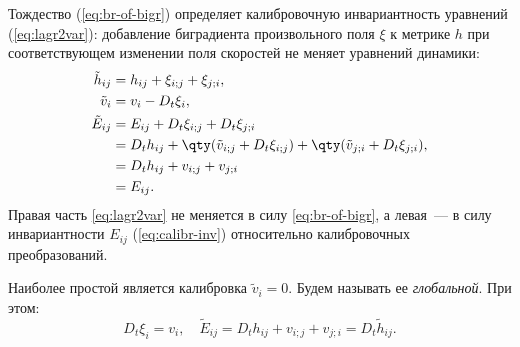 \documentclass[\docroot/reports/draft/report.tex]{subfiles}
\begin{document}
\label{sec:gauge-invariance}

    Тождество (\ref{eq:br-of-bigr}) определяет калибровочную инвариантность уравнений (\ref{eq:lagr2var}): добавление биградиента произвольного поля $\xi$ к метрике $h$ при соответствующем изменении поля скоростей не меняет уравнений динамики:
    \begin{equation}\begin{aligned}\label{eq:calibr-inv}
        \tilde{h}_{ij} &= h_{ij} + \xi_{i;j} + \xi_{j;i}, \\
        \tilde{v}_i    &= v_i - D_t{\xi}_i, \\
        \tilde{E}_{ij} &= E_{ij} + D_t{\xi}_{i;j} + D_t{\xi}_{j;i} \\
                       &= D_t{h}_{ij} + \qty(\tilde{v}_{i;j} + D_t{\xi}_{i;j}) + \qty(\tilde{v}_{j;i} + D_t{\xi}_{j;i}), \\
                       &= D_t{h}_{ij} + v_{i;j} + v_{j;i} \\
                       &= E_{ij} .
    \end{aligned}\end{equation}
    Правая часть \autoref{eq:lagr2var} не меняется в силу \autoref{eq:br-of-bigr}, а левая~--- в силу инвариантности $E_{ij}$ (\autoref{eq:calibr-inv}) относительно калибровочных преобразований.

    Наиболее простой является калибровка $\tilde{v}_i = 0$. Будем называть ее \textit{глобальной}. При этом:
    \begin{equation}\label{eq:calibr-glob}
        D_t{\xi}_i = v_i, \quad \tilde{E}_{ij} = D_t{h}_{ij} + v_{i;j} + v_{j;i} = D_t{\tilde{h}}_{ij} .
    \end{equation}
\end{document}
